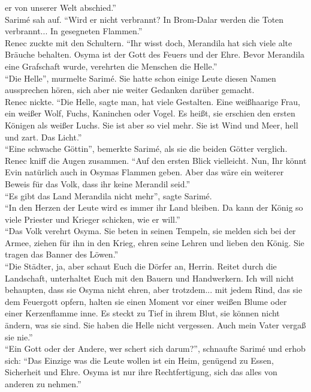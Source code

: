 er von unserer Welt abschied.''\\
Sarimé sah auf. ``Wird er nicht verbrannt? In Brom-Dalar werden die Toten verbrannt... In 
gesegneten Flammen.''\\
Renec zuckte mit den Schultern. ``Ihr wisst doch, Merandila hat sich viele alte Bräuche behalten. 
Osyma ist der Gott des Feuers und der Ehre. Bevor Merandila eine Grafschaft wurde, verehrten die 
Menschen die Helle.''\\
``Die Helle'', murmelte Sarimé. Sie hatte schon einige Leute diesen Namen aussprechen hören, sich 
aber nie weiter Gedanken darüber gemacht.\\
Renec nickte. ``Die Helle, sagte man, hat viele Gestalten. Eine weißhaarige Frau, ein weißer Wolf, 
Fuchs, Kaninchen oder Vogel. Es heißt, sie erschien den ersten Königen als weißer Luchs. Sie ist 
aber so viel mehr. Sie ist Wind und Meer, hell und zart. Das Licht.''\\
``Eine schwache Göttin'', bemerkte Sarimé, als sie die beiden Götter verglich. \\
Renec kniff die Augen zusammen. ``Auf den ersten Blick vielleicht. Nun, Ihr könnt Evin natürlich 
auch in Osymas Flammen geben. Aber das wäre ein weiterer Beweis für das Volk, dass ihr keine 
Merandil seid.''\\
``Es gibt das Land Merandila nicht mehr'', sagte Sarimé.\\
``In den Herzen der Leute wird es immer ihr Land bleiben. Da kann der König so viele Priester und 
Krieger schicken, wie er will.''\\
``Das Volk verehrt Osyma. Sie beten in seinen Tempeln, sie melden sich bei der Armee, ziehen für 
ihn in den Krieg, ehren seine Lehren und lieben den König. Sie tragen das Banner des Löwen.''\\
``Die Städter, ja, aber schaut Euch die Dörfer an, Herrin. Reitet durch die Landschaft, unterhaltet 
Euch mit den Bauern und Handwerkern. Ich will nicht behaupten, dass sie Osyma nicht ehren, aber 
trotzdem... mit jedem Rind, das sie dem Feuergott opfern, halten sie einen Moment vor einer weißen 
Blume oder einer Kerzenflamme inne. Es steckt zu Tief in ihrem Blut, sie können nicht ändern, was 
sie sind. Sie haben die Helle nicht vergessen. Auch mein Vater vergaß sie nie.''\\
``Ein Gott oder der Andere, wer schert sich darum?'', schnaufte Sarimé und erhob sich: ``Das 
Einzige was die Leute wollen ist ein Heim, genügend zu Essen, Sicherheit und Ehre. Osyma ist nur 
ihre Rechtfertigung, sich das alles von anderen zu nehmen.''\\
